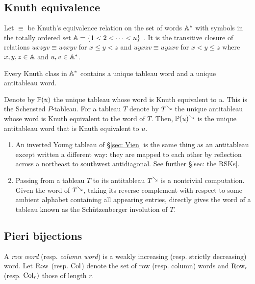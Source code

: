 \documentclass{ert-l} %
\begin{document}
\subsection{Knuth equivalence}
Let $\equiv$ be Knuth's equivalence relation on the set of words $\mathbb{A}^*$ with symbols in the totally ordered set $\mathbb{A} = \{1<2<\dotsm<n\}$
\cite{MR0272654}.
It is the transitive closure of relations $uxzyv\equiv uzxyv$ for $x\le y<z$ and $uyxzv\equiv uyzxv$ for $x<y\le z$ where $x,y,z\in\mathbb{A}$ and $u,v\in\mathbb{A}^*$.

\begin{proposition} \cite{MR0272654}
Every Knuth class in $\mathbb{A}^*$ contains a unique tableau word and a unique antitableau word.
\end{proposition}

Denote by $\mathbb{P}(u)$ the unique tableau whose word is Knuth equivalent to $u$. This is the Schensted $P$-tableau. For a tableau $T$ denote by $T^\searrow$ the unique antitableau whose word is Knuth equivalent to the word of $T$.
Then, $\mathbb{P}(u)^\searrow$ is the unique antitableau word that is Knuth equivalent to $u$.

\begin{remark} \label{R:inverted Young tableau}
\begin{enumerate}
\item
An inverted Young tableau of \S \ref{sec: Vien} is the same thing as
an antitableau except written a different way: they are mapped to each other by
reflection across a northeast to southwest antidiagonal. See further \S\ref{sec: the RSKs}.
\item Passing from a tableau $T$ to its antitableau $T^\searrow$ is a nontrivial computation.
Given the word of $T^\searrow$, taking its reverse complement with respect to some ambient alphabet containing all appearing entries, directly gives the word of a tableau known as the Sch\"utzenberger involution of $T$.
\end{enumerate}
\end{remark}

\subsection{Pieri bijections}
A \textit{row word} (resp. \textit{column word}) is a weakly increasing (resp. strictly decreasing) word. Let $\mathrm{Row}$ (resp. $\mathrm{Col}$) denote the set of row (resp. column) words and $\mathrm{Row}_r$ (resp. $\mathrm{Col}_r)$ those of length $r$.
\end{document}
